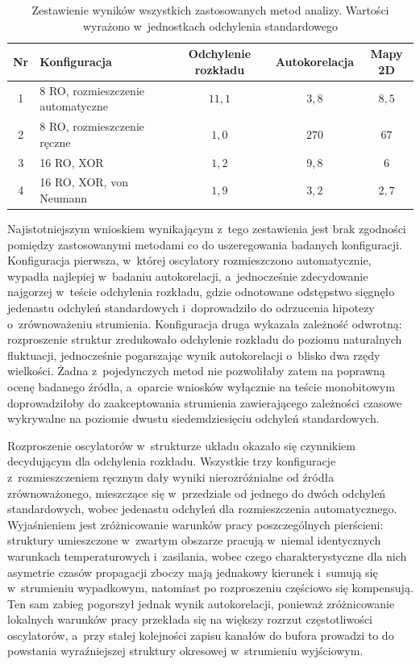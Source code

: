 \begin{table}[htbp]
    \centering
    \caption{Zestawienie wyników wszystkich zastosowanych metod analizy. Wartości
    wyrażono w~jednostkach odchylenia standardowego}
    \label{tab:synteza}
    \small
    \begin{tabular}{clccc}
        \toprule
        Nr & Konfiguracja & Odchylenie rozkładu & Autokorelacja & Mapy 2D \\
        \midrule
        1 & 8 RO, rozmieszczenie automatyczne & $11{,}1$ & $3{,}8$   & $8{,}5$ \\
        2 & 8 RO, rozmieszczenie ręczne       & $1{,}0$  & $270$     & $67$ \\
        3 & 16 RO, XOR                        & $1{,}2$  & $9{,}8$   & $6$ \\
        4 & 16 RO, XOR, von Neumann           & $1{,}9$  & $3{,}2$   & $2{,}7$ \\
        \bottomrule
    \end{tabular}
\end{table}

Najistotniejszym wnioskiem wynikającym z~tego zestawienia jest brak zgodności pomiędzy
zastosowanymi metodami co do uszeregowania badanych konfiguracji. Konfiguracja pierwsza,
w~której oscylatory rozmieszczono automatycznie, wypadła najlepiej w~badaniu
autokorelacji, a~jednocześnie zdecydowanie najgorzej w~teście odchylenia rozkładu, gdzie
odnotowane odstępstwo sięgnęło jedenastu odchyleń standardowych i~doprowadziło do
odrzucenia hipotezy o~zrównoważeniu strumienia. Konfiguracja druga wykazała zależność
odwrotną: rozproszenie struktur zredukowało odchylenie rozkładu do poziomu naturalnych
fluktuacji, jednocześnie pogarszając wynik autokorelacji o~blisko dwa rzędy wielkości.
Żadna z~pojedynczych metod nie pozwoliłaby zatem na poprawną ocenę badanego źródła,
a~oparcie wniosków wyłącznie na teście monobitowym doprowadziłoby do zaakceptowania
strumienia zawierającego zależności czasowe wykrywalne na poziomie dwustu siedemdziesięciu
odchyleń standardowych.

Rozproszenie oscylatorów w~strukturze układu okazało się czynnikiem decydującym dla
odchylenia rozkładu. Wszystkie trzy konfiguracje z~rozmieszczeniem ręcznym dały wyniki
nierozróżnialne od źródła zrównoważonego, mieszczące się w~przedziale od jednego do dwóch
odchyleń standardowych, wobec jedenastu odchyleń dla rozmieszczenia automatycznego.
Wyjaśnieniem jest zróżnicowanie warunków pracy poszczególnych pierścieni: struktury
umieszczone w~zwartym obszarze pracują w~niemal identycznych warunkach temperaturowych
i~zasilania, wobec czego charakterystyczne dla nich asymetrie czasów propagacji zboczy
mają jednakowy kierunek i~sumują się w~strumieniu wypadkowym, natomiast po rozproszeniu
częściowo się kompensują. Ten sam zabieg pogorszył jednak wynik autokorelacji, ponieważ
zróżnicowanie lokalnych warunków pracy przekłada się na większy rozrzut częstotliwości
oscylatorów, a~przy stałej kolejności zapisu kanałów do bufora prowadzi to do powstania
wyraźniejszej struktury okresowej w~strumieniu wyjściowym.

